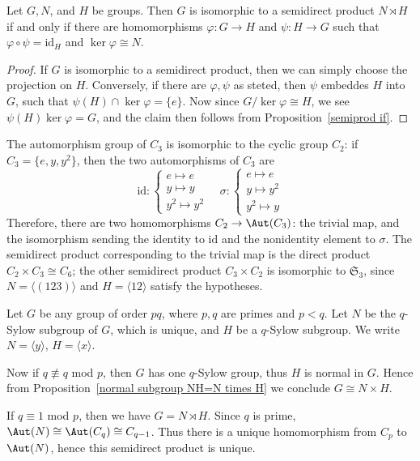 \begin{corollary}
Let $G,N$, and $H$ be groups. Then $G$ is isomorphic to a semidirect product $N\rtimes H$ if and only if there are homomorphisms $\varphi:G\to H$ and $\psi:H\to G$ such that $\varphi\circ\psi=\mathrm{id}_H$ and $\ker\varphi\cong N$.
\end{corollary}
\begin{proof}
If $G$ is isomorphic to a semidirect product, then we can simply choose the projection on $H$. Conversely, if there are $\varphi,\psi$ as steted, then $\psi$ embeddes $H$ into $G$, such that $\psi(H)\cap\ker\varphi=\{e\}$. Now since $G/\ker\varphi\cong H$, we see $\psi(H)\ker\varphi=G$, and the claim then follows from Proposition~\ref{semiprod if}.
\end{proof}
\begin{example}
The automorphism group of $C_3$ is isomorphic to the cyclic group $C_2$: if $C_3=\{e,y,y^2\}$, then the two automorphisms of $C_3$ are
\[\mathrm{id}:\left\{\begin{array}{l}
e\mapsto e\\
y\mapsto y\\
y^2\mapsto y^2
\end{array}\right. \quad \sigma:\left\{\begin{array}{l}
e\mapsto e\\
y\mapsto y^2\\
y^2\mapsto y
\end{array}\right. \]
Therefore, there are two homomorphisms $C_2\to\Aut(C_3)$: the trivial map, and
the isomorphism sending the identity to $\mathrm{id}$ and the nonidentity element to $\sigma$. The semidirect product corresponding to the trivial map is the direct product $C_2\times C_3\cong C_6$; the other semidirect product $C_3\times C_2$ is isomorphic to $\mathfrak{S}_3$, since $N=\langle(123)\rangle$ and $H=\langle 12\rangle$ satisfy the hypotheses.
\end{example}
\begin{example}
Let $G$ be any group of order $pq$, where $p,q$ are primes and $p<q$. Let $N$ be the $q$-Sylow subgroup of $G$, which is unique, and $H$ be a $q$-Sylow subgroup. We write $N=\langle y\rangle$, $H=\langle x\rangle$.\par
Now if $q\not\equiv q$ mod $p$, then $G$ has one $q$-Sylow group, thus $H$ is normal in $G$. Hence from Proposition~\ref{normal subgroup NH=N times H} we conclude $G\cong N\times H$.\par
If $q\equiv 1$ mod $p$, then we have $G=N\rtimes H$. Since $q$ is prime, $\Aut(N)\cong\Aut(C_q)\cong C_{q-1}$. Thus there is a unique homomorphism from $C_p$ to $\Aut(N)$, hence this semidirect product is unique.
\end{example}
